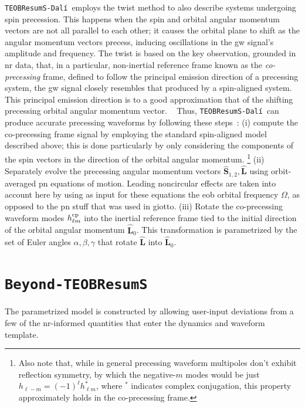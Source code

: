 \documentclass[prd,amssymb,amsmath,amsfonts,nofootinbib,reprint,showpacs,longbibliography]{revtex4-1}
\def\TEOBB{\texttt{Beyond-TEOBResumS}}
\newcommand{\dali}[0]{\texttt{TEOBResumS-Dalí}}
\begin{document}
\dali~employs the twist method to also describe systems undergoing spin precession. This happens
when the spin and orbital angular momentum vectors are not all parallel to each other; it causes
the orbital plane to shift as the angular momentum vectors precess, inducing oscillations in the \ac{gw}
signal's amplitude and frequency. The twist is based on the key observation, grounded in \ac{nr}
data, that, in a particular, non-inertial reference frame known as the \textit{co-precessing} frame,
defined to follow the principal emission direction of a precessing system, the \ac{gw} signal
closely resembles that produced by a spin-aligned system. This principal emission direction
is to a good approximation that of the shifting precessing orbital angular momentum vector.
~\cite{Schmidt:2010it,OShaughnessy:2011pmr,Schmidt:2012rh}
Thus, \dali~can produce accurate precessing waveforms by following these steps~\cite{Gamba:2021yri,
Akcay:2020qrj,Gamba:2024cvy}:
(i) compute the co-precessing frame signal by employing the standard spin-aligned model described above;
this is done particularly by only considering the components of the spin vectors in the
direction of the orbital angular momentum. 
\footnote{Also note that, while in general precessing waveform multipoles don't exhibit
reflection symmetry, by which the negative-$m$ modes would be just $h_{\ell -m} = (-1)^{\ell}
h_{\ell m}^*$, where ${}^*$ indicates complex conjugation, this property approximately
holds in the co-precessing frame.}
(ii) Separately evolve the precessing angular momentum vectors $\bm{\hat{S}}_{1,2}, \hat{\bm{L}}$
using orbit-averaged \ac{pn} equations of motion. 
Leading noncircular effects are taken into account here by using as input for these
equations the \ac{eob} orbital frequency $\Omega$, as opposed to the pn stuff that
was used in giotto. 
(iii) Rotate the co-precessing waveform modes $h_{\ell m}^{\rm cp}$ into the inertial
reference frame tied to the initial direction of the orbital angular momentum $\hat{\bm{L}}_0$. 
This transformation is parametrized by the set of Euler angles $\alpha, \beta, \gamma$ that
rotate $\hat{\bm{L}}$ into $\hat{\bm{L}}_0$.

\section{\TEOBB}
The parametrized model is constructed by allowing user-input deviations from a few of the \ac{nr}-informed quantities
that enter the dynamics and waveform template.
\end{document}
